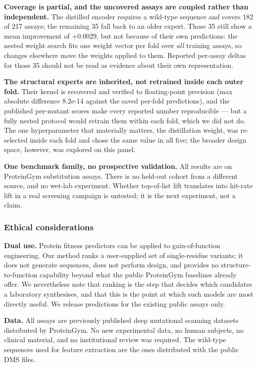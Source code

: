 \documentclass{article}
\begin{document}
\textbf{Coverage is partial, and the uncovered assays are coupled rather than independent.} The distilled
encoder requires a wild-type sequence and covers 182 of 217 assays; the remaining 35 fall back to an
older expert. Those 35 still show a mean improvement of +0.0029, but not because of their own
predictions: the nested weight search fits one weight vector per fold over \emph{all} training assays, so
changes elsewhere move the weights applied to them. Reported per-assay deltas for those 35 should not
be read as evidence about their own representation.

\textbf{The structural experts are inherited, not retrained inside each outer fold.} Their kernel is
recovered and verified to floating-point precision (max absolute difference 8.2e-14 against the saved
per-fold predictions), and the published per-mutant scores make every reported number reproducible ---
but a fully nested protocol would retrain them within each fold, which we did not do. The one
hyperparameter that materially matters, the distillation weight, was re-selected inside each fold and
chose the same value in all five; the broader design space, however, was explored on this panel.

\textbf{One benchmark family, no prospective validation.} All results are on ProteinGym substitution
assays. There is no held-out cohort from a different source, and no wet-lab experiment. Whether
top-of-list lift translates into hit-rate lift in a real screening campaign is untested; it is the
next experiment, not a claim.

\subsubsection*{Ethical considerations}\label{ethical-considerations}

\textbf{Dual use.} Protein fitness predictors can be applied to gain-of-function engineering. Our method
ranks a user-supplied set of single-residue variants; it does not generate sequences, does not perform
design, and provides no structure-to-function capability beyond what the public ProteinGym baselines
already offer. We nevertheless note that ranking is the step that decides which candidates a laboratory
synthesises, and that this is the point at which such models are most directly useful. We release
predictions for the existing public assays only.

\textbf{Data.} All assays are previously published deep mutational scanning datasets distributed by
ProteinGym. No new experimental data, no human subjects, no clinical material, and no institutional
review was required. The wild-type sequences used for feature extraction are the ones distributed with
the public DMS files.
\end{document}

